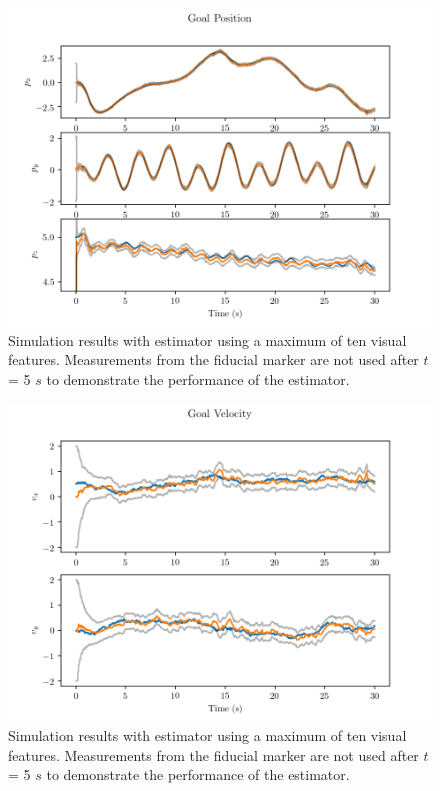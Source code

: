 \begin{figure}
  \centering
  \includegraphics[scale=0.5]{plots/with_lms_gp.png}
  \caption{Simulation results with estimator using a maximum of ten visual
  features. Measurements from the fiducial marker are not used after $t$ = 5
$s$ to demonstrate the performance of the estimator.}
  \label{fig:with_lms_gp}
\end{figure}

\begin{figure}
  \centering
  \includegraphics[scale=0.5]{plots/with_lms_gv.png}
  \caption{Simulation results with estimator using a maximum of ten visual
  features. Measurements from the fiducial marker are not used after $t$ = 5
$s$ to demonstrate the performance of the estimator.}
  \label{fig:with_lms_gv}
\end{figure}

